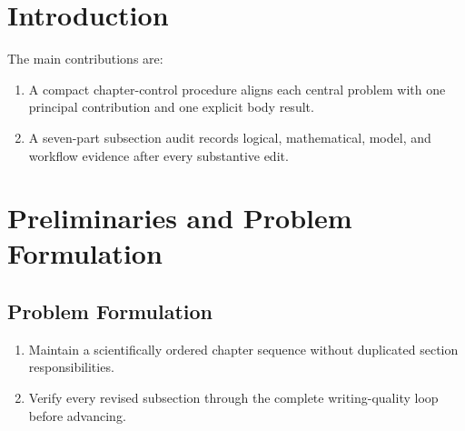 \documentclass{article}
\begin{document}
\begin{abstract}
Reliable manuscript construction requires more than grammatical correction.
This fixture represents a compact journal structure in which the chapter
sequence, local argument, notation, equations, model description, and
experimental workflow are checked after every substantive edit. The method
uses a section-role matrix to keep each section tied to one scientific
question and one reader-facing result, while a notation ledger registers every
mathematical object before use. A subsection audit then records the logical
role of adjacent sentences, the causal chain from the motivating limitation to
the proposed mechanism and its consequence, and the assumptions and dimensions
needed by each formula. It also verifies that model inputs, outputs, states,
mappings, and update order are complete. Training, validation, testing, and
deployment are described as separate flows so that model selection and
preprocessing cannot leak test information. The resulting workflow provides a
repeatable record of revisions and blocks delivery whenever an unresolved
conflict remains. This record also supports transparent review.
\end{abstract}

\section{Introduction}

The main contributions are:

\begin{enumerate}
\item A compact chapter-control procedure aligns each central problem with one
principal contribution and one explicit body result.
\item A seven-part subsection audit records logical, mathematical, model, and
workflow evidence after every substantive edit.
\end{enumerate}

\section{Preliminaries and Problem Formulation}

\subsection{Problem Formulation}

\begin{enumerate}
\item Maintain a scientifically ordered chapter sequence without duplicated
section responsibilities.
\item Verify every revised subsection through the complete writing-quality
loop before advancing.
\end{enumerate}
\end{document}
